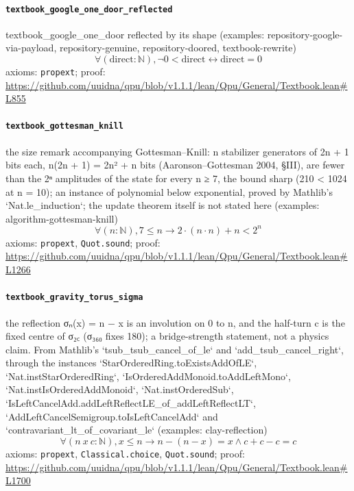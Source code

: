 \documentclass[11pt]{article}
\begin{document}
\paragraph{\texttt{textbook\_google\_one\_door\_reflected}}
textbook\_google\_one\_door reflected by its shape (examples: repository-google-via-payload, repository-genuine, repository-doored, textbook-rewrite)
\[ \forall (\mathrm{direct} : \mathbb{N}), \neg 0 < \mathrm{direct} \leftrightarrow \mathrm{direct} = 0 \]
\noindent axioms: \texttt{propext}; proof: \url{https://github.com/uuidna/qpu/blob/v1.1.1/lean/Qpu/General/Textbook.lean\#L855}

\paragraph{\texttt{textbook\_gottesman\_knill}}
the size remark accompanying Gottesman–Knill: n stabilizer generators of 2n + 1 bits each, n(2n + 1) = 2n² + n bits (Aaronson–Gottesman 2004, §III), are fewer than the 2ⁿ amplitudes of the state for every n ≥ 7, the bound sharp (210 < 1024 at n = 10); an instance of polynomial below exponential, proved by Mathlib's `Nat.le\_induction`; the update theorem itself is not stated here (examples: algorithm-gottesman-knill)
\[ \forall (n : \mathbb{N}), 7 \le n \to 2 \cdot (n \cdot n) + n < 2 ^{n} \]
\noindent axioms: \texttt{propext}, \texttt{Quot.sound}; proof: \url{https://github.com/uuidna/qpu/blob/v1.1.1/lean/Qpu/General/Textbook.lean\#L1266}

\paragraph{\texttt{textbook\_gravity\_torus\_sigma}}
the reflection σₙ(x) = n − x is an involution on 0 to n, and the half-turn c is the fixed centre of σ₂꜀ (σ₃₆₀ fixes 180); a bridge-strength statement, not a physics claim. From Mathlib's `tsub\_tsub\_cancel\_of\_le` and `add\_tsub\_cancel\_right`, through the instances `StarOrderedRing.toExistsAddOfLE`, `Nat.instStarOrderedRing`, `IsOrderedAddMonoid.toAddLeftMono`, `Nat.instIsOrderedAddMonoid`, `Nat.instOrderedSub`, `IsLeftCancelAdd.addLeftReflectLE\_of\_addLeftReflectLT`, `AddLeftCancelSemigroup.toIsLeftCancelAdd` and `contravariant\_lt\_of\_covariant\_le` (examples: clay-reflection)
\[ \forall (n\ x\ c : \mathbb{N}), x \le n \to n - (n - x) = x \land c + c - c = c \]
\noindent axioms: \texttt{propext}, \texttt{Classical.choice}, \texttt{Quot.sound}; proof: \url{https://github.com/uuidna/qpu/blob/v1.1.1/lean/Qpu/General/Textbook.lean\#L1700}
\end{document}

